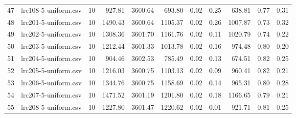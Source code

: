 \begin{tabular}{llrrrrrrrrr}
47 &  lrc108-5-uniform.csv &         10 &           927.81 &     3600.64 &             693.80 &           0.02 &      0.25 &              638.81 &            0.77 &       0.31 \\
48 &  lrc201-5-uniform.csv &         10 &          1490.43 &     3600.64 &            1105.37 &           0.02 &      0.26 &             1007.87 &            0.73 &       0.32 \\
49 &  lrc202-5-uniform.csv &         10 &          1308.36 &     3601.70 &            1161.76 &           0.02 &      0.11 &             1020.79 &            0.74 &       0.22 \\
50 &  lrc203-5-uniform.csv &         10 &          1212.44 &     3601.33 &            1013.78 &           0.02 &      0.16 &              974.48 &            0.80 &       0.20 \\
51 &  lrc204-5-uniform.csv &         10 &           904.46 &     3602.53 &             785.49 &           0.02 &      0.13 &              674.51 &            0.82 &       0.25 \\
52 &  lrc205-5-uniform.csv &         10 &          1216.03 &     3600.75 &            1103.13 &           0.02 &      0.09 &              960.41 &            0.82 &       0.21 \\
53 &  lrc206-5-uniform.csv &         10 &          1344.76 &     3600.75 &            1158.69 &           0.02 &      0.14 &              965.31 &            0.80 &       0.28 \\
54 &  lrc207-5-uniform.csv &         10 &          1471.52 &     3601.19 &            1201.80 &           0.02 &      0.18 &             1166.65 &            0.79 &       0.21 \\
55 &  lrc208-5-uniform.csv &         10 &          1227.80 &     3601.47 &            1220.62 &           0.02 &      0.01 &              921.71 &            0.81 &       0.25 \\
\bottomrule
\end{tabular}
